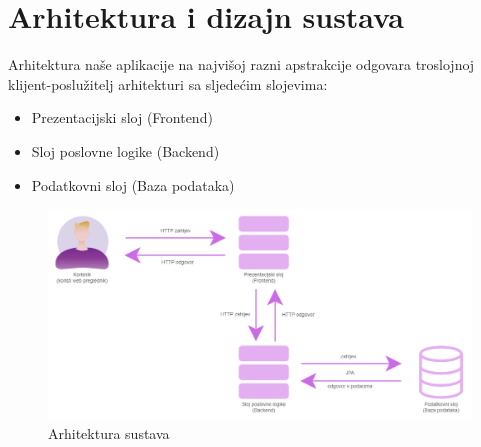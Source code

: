 \chapter{Arhitektura i dizajn sustava}
		

				
		Arhitektura naše aplikacije na najvišoj razni apstrakcije odgovara troslojnoj klijent-poslužitelj arhitekturi sa sljedećim slojevima:
		\begin{itemize}
			\item Prezentacijski sloj (Frontend)
			\item Sloj poslovne logike (Backend)
			\item Podatkovni sloj (Baza podataka)
		\end{itemize}

		\begin{figure}[H]
			\includegraphics[width=\textwidth,height=0.4\textheight]{slike/Arhitektura.png}
			\centering
			\caption{Arhitektura sustava}
			\label{fig:Arhitektura}
		\end{figure}

